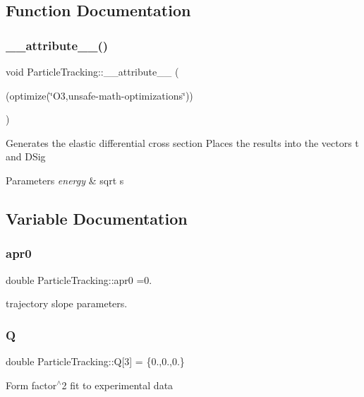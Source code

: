 \subsection{Function Documentation}
\mbox{\label{namespaceParticleTracking_a1064dfa4c548a311ce007c08f0f3a17b}} 
\subsubsection{\texorpdfstring{\+\_\+\+\_\+attribute\+\_\+\+\_\+()}{\_\_attribute\_\_()}}
{\footnotesize\ttfamily void Particle\+Tracking\+::\+\_\+\+\_\+attribute\+\_\+\+\_\+ (\begin{DoxyParamCaption}\item[{(optimize(\char`\"{}O3,unsafe-\/math-\/optimizations\char`\"{}))}]{ }\end{DoxyParamCaption})}

Generates the elastic differential cross section Places the results into the vectors t and D\+Sig 
\begin{DoxyParams}{Parameters}
{\em energy} & sqrt s \\
\hline
\end{DoxyParams}


\subsection{Variable Documentation}
\mbox{\label{namespaceParticleTracking_af89aac299c3f942237a89b0a2d76271d}} 
\subsubsection{\texorpdfstring{apr0}{apr0}}
{\footnotesize\ttfamily double Particle\+Tracking\+::apr0 =0.}

trajectory slope parameters. \mbox{\label{namespaceParticleTracking_a3e89510a540596b235a808915deb0f7a}} 
\subsubsection{\texorpdfstring{Q}{Q}}
{\footnotesize\ttfamily double Particle\+Tracking\+::Q\mbox{[}3\mbox{]} = \{0.,0.,0.\}}

Form factor$^\wedge$2 fit to experimental data 